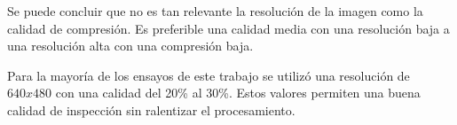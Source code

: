          Se puede concluir que no es tan relevante la resolución de la imagen como la calidad de compresión. Es preferible una calidad media con una resolución baja a una resolución alta con una compresión baja.\par
         Para la mayoría de los ensayos de este trabajo se utilizó una resolución de $640x480$ con una calidad del 20\% al 30\%. Estos valores permiten una buena calidad de inspección sin ralentizar el procesamiento.

